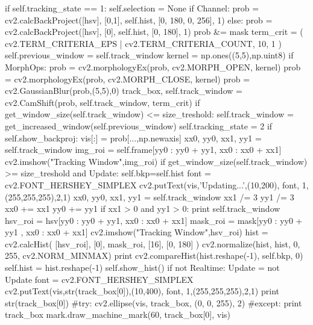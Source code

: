 \documentclass{article}
\begin{document}
\begin{python}
            if self.tracking_state == 1:
                self.selection = None
                if Channel:
                    prob = cv2.calcBackProject([hsv], [0,1], self.hist, [0, 180, 0, 256], 1)
                else:
                    prob = cv2.calcBackProject([hsv], [0], self.hist, [0, 180], 1)
                prob &= mask
                term_crit = ( cv2.TERM_CRITERIA_EPS | cv2.TERM_CRITERIA_COUNT, 10, 1 )
                self.previous_window = self.track_window
                kernel = np.ones((5,5),np.uint8)
                if MorphOps:
                    prob = cv2.morphologyEx(prob, cv2.MORPH_OPEN, kernel)
                    prob = cv2.morphologyEx(prob, cv2.MORPH_CLOSE, kernel)
                prob = cv2.GaussianBlur(prob,(5,5),0)
                track_box, self.track_window = cv2.CamShift(prob, self.track_window, term_crit)
                if get_window_size(self.track_window) <= size_treshold:
                    self.track_window = get_increased_window(self.previous_window)
                    self.tracking_state = 2
                if self.show_backproj:
                    vis[:] = prob[...,np.newaxis]
                xx0, yy0, xx1, yy1 = self.track_window
                img_roi = self.frame[yy0 : yy0 + yy1, xx0 : xx0 + xx1]
                cv2.imshow("Tracking Window",img_roi)
                if get_window_size(self.track_window) >= size_treshold and Update:
                    self.bkp=self.hist
                    font = cv2.FONT_HERSHEY_SIMPLEX
                    cv2.putText(vis,'Updating...',(10,200), font, 1,(255,255,255),2,1)
                    xx0, yy0, xx1, yy1 = self.track_window
                    xx1 /= 3
                    yy1 /= 3
                    xx0 += xx1
                    yy0 += yy1
                    if xx1 > 0 and yy1 > 0:
                        print self.track_window
                        hsv_roi = hsv[yy0 : yy0 + yy1, xx0 : xx0 + xx1]
                        mask_roi = mask[yy0 : yy0 + yy1 , xx0 : xx0 + xx1]
                        cv2.imshow("Tracking Window",hsv_roi)
                        hist = cv2.calcHist( [hsv_roi], [0], mask_roi, [16], [0, 180] )
                        cv2.normalize(hist, hist, 0, 255, cv2.NORM_MINMAX)
                        print cv2.compareHist(hist.reshape(-1), self.bkp, 0)
                        self.hist = hist.reshape(-1)
                    self.show_hist()
                    if not Realtime:
                        Update = not Update
                font = cv2.FONT_HERSHEY_SIMPLEX
                cv2.putText(vis,str(track_box[0]),(10,400), font, 1,(255,255,255),2,1)
                print str(track_box[0])
                #try: cv2.ellipse(vis, track_box, (0, 0, 255), 2)
                #except: print track_box
                mark.draw_machine_mark(60, track_box[0], vis)


\end{python}
\end{document}
